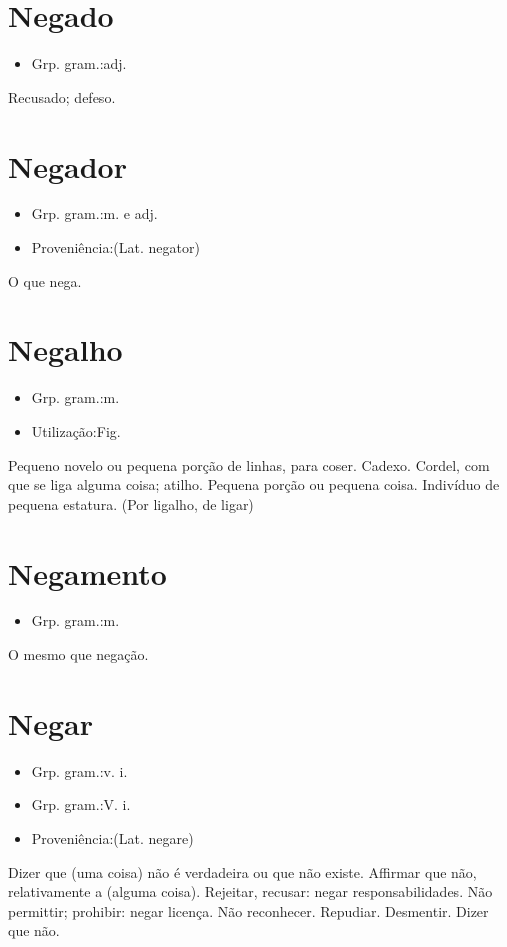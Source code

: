\section{Negado}
\begin{itemize}
\item {Grp. gram.:adj.}
\end{itemize}
Recusado; defeso.
\section{Negador}
\begin{itemize}
\item {Grp. gram.:m.  e  adj.}
\end{itemize}
\begin{itemize}
\item {Proveniência:(Lat. \textunderscore negator\textunderscore )}
\end{itemize}
O que nega.
\section{Negalho}
\begin{itemize}
\item {Grp. gram.:m.}
\end{itemize}
\begin{itemize}
\item {Utilização:Fig.}
\end{itemize}
Pequeno novelo ou pequena porção de linhas, para coser.
Cadexo.
Cordel, com que se liga alguma coisa; atilho.
Pequena porção ou pequena coisa.
Indivíduo de pequena estatura.
(Por \textunderscore ligalho\textunderscore , de \textunderscore ligar\textunderscore )
\section{Negamento}
\begin{itemize}
\item {Grp. gram.:m.}
\end{itemize}
O mesmo que \textunderscore negação\textunderscore .
\section{Negar}
\begin{itemize}
\item {Grp. gram.:v. i.}
\end{itemize}
\begin{itemize}
\item {Grp. gram.:V. i.}
\end{itemize}
\begin{itemize}
\item {Proveniência:(Lat. \textunderscore negare\textunderscore )}
\end{itemize}
Dizer que (uma coisa) não é verdadeira ou que não existe.
Affirmar que não, relativamente a (alguma coisa).
Rejeitar, recusar: \textunderscore negar responsabilidades\textunderscore .
Não permittir; prohibir: \textunderscore negar licença\textunderscore .
Não reconhecer.
Repudiar.
Desmentir.
Dizer que não.
